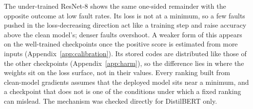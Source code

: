 The under-trained ResNet-8 shows the same one-sided remainder with the opposite outcome at low fault rates. Its loss is not at a minimum, so a few faults pushed in the loss-decreasing direction act like a training step and raise accuracy above the clean model's; denser faults overshoot. A weaker form of this appears on the well-trained checkpoints once the positive score is estimated from more inputs (Appendix~\ref{app:calibration}). Its stored codes are distributed like those of the other checkpoints (Appendix~\ref{app:harm}), so the difference lies in where the weights sit on the loss surface, not in their values. Every ranking built from clean-model gradients assumes that the deployed model sits near a minimum, and a checkpoint that does not is one of the conditions under which a fixed ranking can mislead. The mechanism was checked directly for DistilBERT only.

